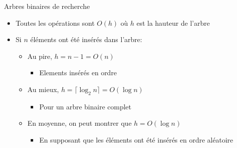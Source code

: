 \begin{frame}{Arbres binaires de recherche}

\begin{itemize}
\item Toutes les opérations sont $O(h)$ où $h$ est la hauteur de l'arbre
\item Si $n$ éléments ont été insérés dans l'arbre:
\begin{itemize}
\item Au pire, $h=n-1=O(n)$
\begin{itemize}
\item Elements insérés en ordre
\end{itemize}
\item Au mieux, $h=\lceil\log_2 n\rceil=O(\log n)$
\begin{itemize}
\item Pour un arbre binaire complet
\end{itemize}
\item En moyenne, on peut montrer que $h=O(\log n)$
\begin{itemize}
\item En supposant que les éléments ont été insérés en ordre aléatoire
\end{itemize}
\end{itemize}
\end{itemize}
\end{frame}

